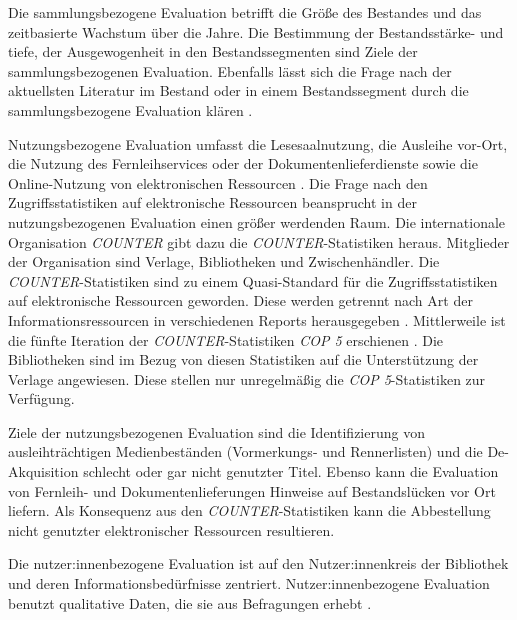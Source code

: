 Die sammlungsbezogene Evaluation betrifft die Größe des Bestandes und das zeitbasierte Wachstum über die Jahre. Die Bestimmung der Bestandsstärke- und tiefe, 
der Ausgewogenheit in den Bestandssegmenten sind Ziele der sammlungsbezogenen Evaluation. 
Ebenfalls lässt sich die Frage nach der aktuellsten Literatur im Bestand oder in einem Bestandssegment durch die sammlungsbezogene Evaluation klären
\cite[vgl.][S. 48 f.]{lyons_lucy_eleonore_collection_2010}.

Nutzungsbezogene Evaluation umfasst die Lesesaalnutzung, die Ausleihe vor-Ort, die Nutzung des Fernleihservices oder der Dokumentenlieferdienste 
sowie die Online-Nutzung von elektronischen Ressourcen \cite[vgl.][S. 254 ff.]{johannsen_jochen_bestands-_2015}.
Die Frage nach den Zugriffsstatistiken auf elektronische Ressourcen beansprucht in der nutzungsbezogenen Evaluation einen größer werdenden Raum.
Die internationale Organisation \textit{\acrfull{COUNTER}} gibt dazu die \textit{\acrshort{COUNTER}}-Statistiken heraus. Mitglieder der Organisation sind Verlage, Bibliotheken
und Zwischenhändler. Die \textit{\acrshort{COUNTER}}-Statistiken sind zu einem Quasi-Standard für die Zugriffsstatistiken 
auf elektronische Ressourcen geworden. Diese werden getrennt nach Art der Informationsressourcen in verschiedenen Reports herausgegeben \cite[vgl.][S. 260 ff.]{johannsen_jochen_bestands-_2015}. 
Mittlerweile ist die fünfte Iteration der \textit{\acrshort{COUNTER}}-Statistiken \textit{\acrshort{COP 5}} erschienen \cite[vgl.][]{counter_abstract_2020}.
Die Bibliotheken sind im Bezug von diesen Statistiken auf die Unterstützung der Verlage angewiesen. Diese stellen nur unregelmäßig die \textit{\acrshort{COP 5}}-Statistiken zur
Verfügung. 

Ziele der nutzungsbezogenen Evaluation sind die Identifizierung von ausleihträchtigen Medienbeständen (Vormerkungs- und Rennerlisten) und
die De-Akquisition schlecht oder gar nicht genutzter Titel. Ebenso kann die Evaluation von Fernleih- und Dokumentenlieferungen Hinweise auf Bestandslücken vor Ort liefern.
Als Konsequenz aus den \textit{\acrshort{COUNTER}}-Statistiken kann die Abbestellung nicht genutzter elektronischer Ressourcen resultieren.

Die nutzer:innenbezogene Evaluation ist auf den Nutzer:innenkreis der Bibliothek und deren Informationsbedürfnisse zentriert. 
Nutzer:innenbezogene Evaluation benutzt qualitative Daten, die sie aus Befragungen erhebt
\cites[vgl.][302]{johnson_peggy_fundamentals_2014}[vgl.][S. 255 ff.]{johannsen_jochen_bestands-_2015}.

